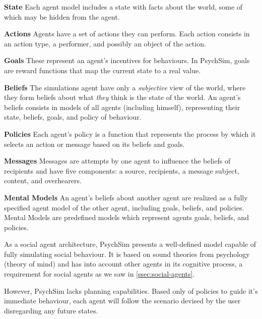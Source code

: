 \begin{description}
\item \textbf{State} Each agent model includes a state with facts about the world, some of which may be hidden from the agent.
\item \textbf{Actions} Agents have a set of actions they can perform. Each action consists in an action type, a performer, and possibly an object of the action.
\item \textbf{Goals} These represent an agent's incentives for behaviours. In PsychSim, goals are reward functions that map the current state to a real value.
\item \textbf{Beliefs} The simulations agent have only a \textit{subjective} view of the world, where they form beliefs about what \textit{they} think is the state of the world. An agent's beliefs consists in models of all agents (including himself), representing their state, beliefs, goals, and policy of behaviour.
\item \textbf{Policies} Each agent's policy is a function that represents the process by which it selects an action or message based on its beliefs and goals.
\item \textbf{Messages} Messages are attempts by one agent to influence the beliefs of recipients and have five components: a source, recipients, a message subject, content, and overhearers.
\item \textbf{Mental Models} An agent's beliefs about another agent are realized as a fully specified agent model of the other agent, including goals, beliefs, and policies. Mental Models are predefined models which represent agents goals, beliefs, and policies.
\end{description}

As a social agent architecture, PsychSim presents a well-defined model capable of fully simulating social behaviour.
It is based on sound theories from psychology (theory of mind) and has into account other agents in its cognitive process, a requirement for social agents as we saw in \ref{ssec:social-agents}.

However, PsychSim lacks planning capabilities.
Based only of policies to guide it's immediate behaviour, each agent will follow the scenario devised by the user disregarding any future states.